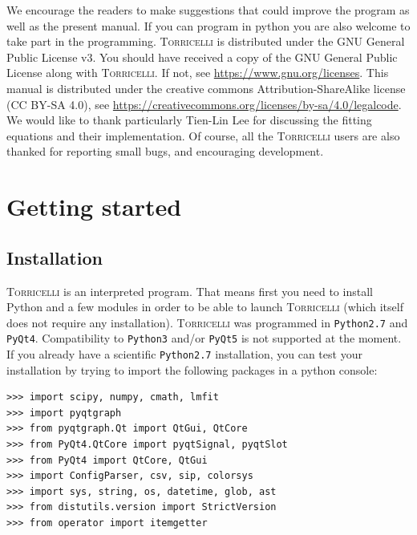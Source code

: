 \documentclass[oldfontcommands,openany,oneside]{memoir}
\begin{document}
We encourage the readers to make suggestions that could improve the program as well as the present manual. If you can program in python you are also welcome to take part in the programming. \textsc{Torricelli} is distributed under the GNU General Public License v3. You should have received a copy of the GNU General Public License along with \textsc{Torricelli}.  If not, see \url{https://www.gnu.org/licenses}. This manual is distributed under the creative commons Attribution-ShareAlike license (CC BY-SA 4.0), see \url{https://creativecommons.org/licenses/by-sa/4.0/legalcode}.\\

We would like to thank particularly Tien-Lin Lee for discussing the fitting equations and their implementation. Of course, all the \textsc{Torricelli} users are also thanked for reporting small bugs, and encouraging development. \newpage

\tableofcontents
\mainmatter

\chapter{Getting started}
\section{Installation} %
\textsc{Torricelli} is an interpreted program. That means first you need to install Python and a few modules in order to be able to launch \textsc{Torricelli} (which itself does not require any installation). \textsc{Torricelli} was programmed in \texttt{Python2.7} and \texttt{PyQt4}. Compatibility to \texttt{Python3} and/or \texttt{PyQt5} is not supported at the moment. If you already have a scientific \texttt{Python2.7} installation, you can test your installation by trying to import the following packages in a python console:

\begin{verbatim}
>>> import scipy, numpy, cmath, lmfit
>>> import pyqtgraph
>>> from pyqtgraph.Qt import QtGui, QtCore
>>> from PyQt4.QtCore import pyqtSignal, pyqtSlot
>>> from PyQt4 import QtCore, QtGui
>>> import ConfigParser, csv, sip, colorsys
>>> import sys, string, os, datetime, glob, ast
>>> from distutils.version import StrictVersion
>>> from operator import itemgetter
\end{verbatim}
\end{document}
